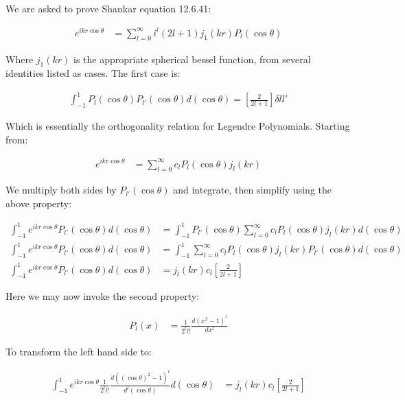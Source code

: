 \documentclass[paper=a4, fontsize=11pt]{scrartcl} %
\numberwithin{equation}{section} %
\numberwithin{figure}{section} %
\numberwithin{table}{section} %
\begin{document}
We are asked to prove Shankar equation 12.6.41:

\begin{align}
e^{i k r \cos \theta} &= \sum_{l = 0}^{\infty} i^l (2l + 1) j_1(kr)P_l(\cos\theta)
\end{align}

Where $j_1(kr)$ is the appropriate spherical bessel function, from several identities listed as cases. The first case is:

\begin{align}
\int_{-1}^{1} P_{l}(\cos \theta) P_{l'}(\cos \theta)d(\cos\theta) = [\frac{2}{2l+1}]\delta{ll'} 
\end{align}

Which is essentially the orthogonality relation for Legendre Polynomials. Starting from:

\begin{align}
e^{ikr \cos\theta} &= \sum_{l=0}^{\infty} c_l P_l(\cos\theta)j_l(kr)
\end{align}

We multiply both sides by $P_{l'}(\cos\theta)$ and integrate, then simplify using the above property:

\begin{align}
\int_{-1}^{1} e^{ikr \cos\theta} P_{l'}(\cos\theta) d(\cos\theta) &= \int_{-1}^{1} P_{l'}(\cos\theta) \sum_{l=0}^{\infty} c_l P_l(\cos\theta)j_l(kr) d(\cos\theta) \\
\int_{-1}^{1} e^{ikr \cos\theta} P_{l'}(\cos\theta) d(\cos\theta) &= \int_{-1}^{1} \sum_{l=0}^{\infty} c_l P_l(\cos\theta)j_l(kr)P_{l'}(\cos\theta) d(\cos\theta) \\ 
\int_{-1}^{1} e^{ikr \cos\theta} P_{l'}(\cos\theta) d(\cos\theta) &= j_{l}(kr) c_l [\frac{2}{2l+1}]                                                  
\end{align}

Here we may now invoke the second property:

\begin{align}
P_l(x) &= \frac{1}{2^l l!} \frac{d(x^2 - 1)^l}{dx^l}
\end{align}

To transform the left hand side to:

\begin{align}
\int_{-1}^{1} e^{ikr \cos\theta} \frac{1}{2^l l!} \frac{d((\cos\theta)^2 - 1)^l}{d^l(\cos\theta)} d(\cos\theta) &= j_{l}(kr) c_l [\frac{2}{2l+1}] \\
\end{align}
\end{document}
